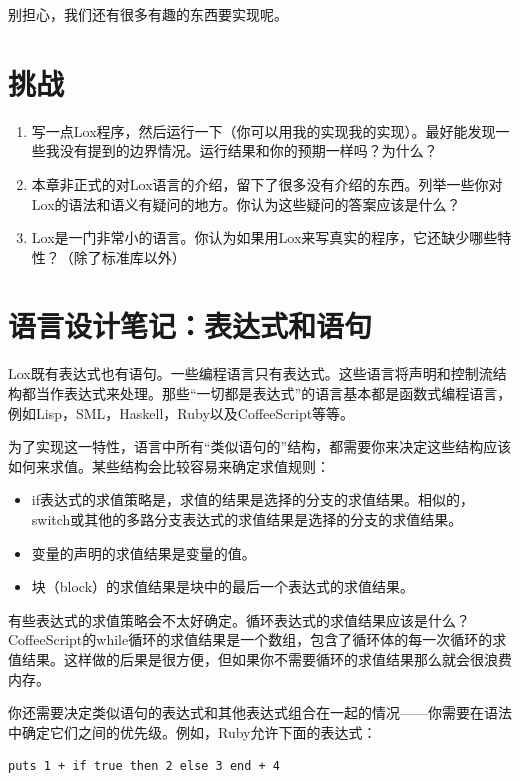 \documentclass[cn,10pt,math=newtx,citestyle=gb7714-2015,bibstyle=gb7714-2015]{elegantbook}
\begin{document}
别担心，我们还有很多有趣的东西要实现呢。

\section{挑战}

\begin{enumerate}
\item 写一点Lox程序，然后运行一下（你可以用我的实现我的实现）。最好能发现一些我没有提到的边界情况。运行结果和你的预期一样吗？为什么？
\item 本章非正式的对Lox语言的介绍，留下了很多没有介绍的东西。列举一些你对Lox的语法和语义有疑问的地方。你认为这些疑问的答案应该是什么？
\item Lox是一门非常小的语言。你认为如果用Lox来写真实的程序，它还缺少哪些特性？（除了标准库以外）
\end{enumerate}

\section{语言设计笔记：表达式和语句}

Lox既有表达式也有语句。一些编程语言只有表达式。这些语言将声明和控制流结构都当作表达式来处理。那些“一切都是表达式”的语言基本都是函数式编程语言，例如Lisp，SML，Haskell，Ruby以及CoffeeScript等等。

为了实现这一特性，语言中所有“类似语句的”结构，都需要你来决定这些结构应该如何来求值。某些结构会比较容易来确定求值规则：

\begin{itemize}
   \item if表达式的求值策略是，求值的结果是选择的分支的求值结果。相似的，switch或其他的多路分支表达式的求值结果是选择的分支的求值结果。
   \item 变量的声明的求值结果是变量的值。
   \item 块（block）的求值结果是块中的最后一个表达式的求值结果。
\end{itemize}

有些表达式的求值策略会不太好确定。循环表达式的求值结果应该是什么？CoffeeScript的while循环的求值结果是一个数组，包含了循环体的每一次循环的求值结果。这样做的后果是很方便，但如果你不需要循环的求值结果那么就会很浪费内存。

你还需要决定类似语句的表达式和其他表达式组合在一起的情况——你需要在语法中确定它们之间的优先级。例如，Ruby允许下面的表达式：

\begin{verbatim}
puts 1 + if true then 2 else 3 end + 4
\end{verbatim}
\end{document}
